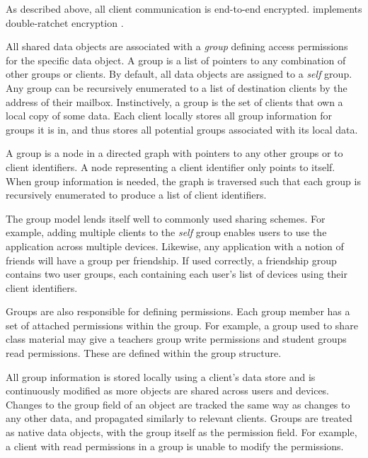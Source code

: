 As described above, all client communication is end-to-end encrypted. \name{} implements double-ratchet encryption \tocite{}. 
 

All shared data objects are associated with a \textit{group} defining access permissions for the specific data object. A group is a list of pointers to any combination of other groups or clients. By default, all \name{} data objects are assigned to a \textit{self} group. Any group can be recursively enumerated to a list of destination clients by the address of their mailbox. Instinctively, a group is the set of clients that own a local copy of some data.
Each client locally stores all group information for groups it is in, and thus stores all potential groups associated with its local data. 

A group is a node in a directed graph with pointers to any other groups or to client identifiers. A node representing a client identifier only points to itself. When group information is needed, the graph is traversed such that each group is recursively enumerated to produce a list of client identifiers. 

The group model lends itself well to commonly used sharing schemes. For example, adding multiple clients to the \textit{self} group enables users to use the application across multiple devices. Likewise, any application with a notion of friends will have a group per friendship. If used correctly, a friendship group contains two user groups, each containing each user's list of devices using their client identifiers.

Groups are also responsible for defining permissions. Each group member has a set of attached permissions within the group. For example, a group used to share class material may give a teachers group write permissions and student groups read permissions. These are defined within the group structure.

All group information is stored locally using a client's data store and is continuously modified as more objects are shared across users and devices.
Changes to the group field of an object are tracked the same way as changes to any other data, and propagated similarly to relevant clients. Groups are treated as \name{} native data objects, with the group itself as the permission field. For example, a client with read permissions in a group is unable to modify the permissions. 

